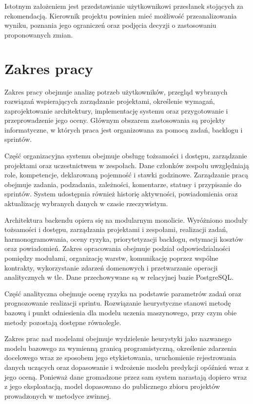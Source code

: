 Istotnym założeniem jest przedstawianie użytkownikowi przesłanek stojących za rekomendacją. Kierownik projektu powinien mieć możliwość przeanalizowania wyniku, poznania jego ograniczeń oraz podjęcia decyzji o zastosowaniu proponowanych zmian.

\section{Zakres pracy}

Zakres pracy obejmuje analizę potrzeb użytkowników, przegląd wybranych rozwiązań wspierających zarządzanie projektami, określenie wymagań, zaprojektowanie architektury, implementację systemu oraz przygotowanie i przeprowadzenie jego oceny. Głównym obszarem zastosowania są projekty informatyczne, w których praca jest organizowana za pomocą zadań, backlogu i sprintów.

Część organizacyjna systemu obejmuje obsługę tożsamości i dostępu, zarządzanie projektami oraz uczestnictwem w zespołach. Dane członków zespołu uwzględniają role, kompetencje, deklarowaną pojemność i stawki godzinowe. Zarządzanie pracą obejmuje zadania, podzadania, zależności, komentarze, statusy i przypisanie do sprintów. System udostępnia również historię aktywności, powiadomienia oraz aktualizację wybranych danych w czasie rzeczywistym.

Architektura backendu opiera się na modularnym monolicie. Wyróżniono moduły tożsamości i dostępu, zarządzania projektami i zespołami, realizacji zadań, harmonogramowania, oceny ryzyka, priorytetyzacji backlogu, estymacji kosztów oraz powiadomień. Zakres opracowania obejmuje podział odpowiedzialności pomiędzy modułami, organizację warstw, komunikację poprzez wspólne kontrakty, wykorzystanie zdarzeń domenowych i przetwarzanie operacji analitycznych w tle. Dane przechowywane są w relacyjnej bazie PostgreSQL.

Część analityczna obejmuje ocenę ryzyka na podstawie parametrów zadań oraz prognozowanie realizacji sprintu. Rozwiązanie heurystyczne stanowi metodę bazową i punkt odniesienia dla modelu uczenia maszynowego, przy czym obie metody pozostają dostępne równolegle.

Zakres prac nad modelami obejmuje wydzielenie heurystyki jako nazwanego modelu bazowego za wymienną granicą programistyczną, określenie zdarzenia docelowego wraz ze sposobem jego etykietowania, uruchomienie rejestrowania danych uczących oraz dopasowanie i wdrożenie modelu predykcji opóźnień wraz z jego oceną. Ponieważ dane gromadzone przez sam system narastają dopiero wraz z jego eksploatacją, model dopasowano do publicznego zbioru projektów prowadzonych w metodyce zwinnej.

